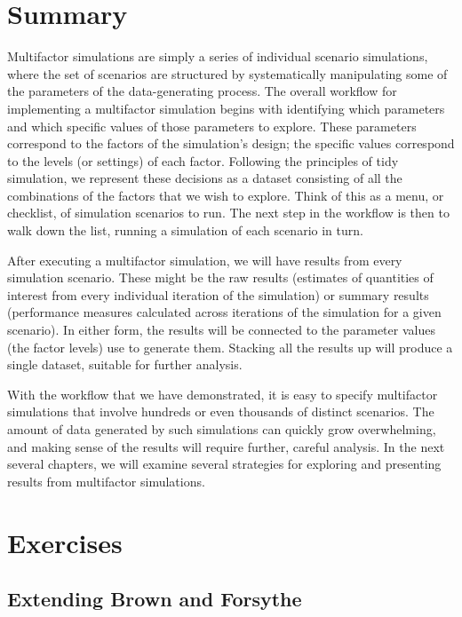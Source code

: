 \documentclass[
]{book}
\begin{document}
\section{Summary}\label{summary}

Multifactor simulations are simply a series of individual scenario simulations, where the set of scenarios are structured by systematically manipulating some of the parameters of the data-generating process.
The overall workflow for implementing a multifactor simulation begins with identifying which parameters and which specific values of those parameters to explore.
These parameters correspond to the factors of the simulation's design; the specific values correspond to the levels (or settings) of each factor.
Following the principles of tidy simulation, we represent these decisions as a dataset consisting of all the combinations of the factors that we wish to explore.
Think of this as a menu, or checklist, of simulation scenarios to run.
The next step in the workflow is then to walk down the list, running a simulation of each scenario in turn.

After executing a multifactor simulation, we will have results from every simulation scenario.
These might be the raw results (estimates of quantities of interest from every individual iteration of the simulation) or summary results (performance measures calculated across iterations of the simulation for a given scenario).
In either form, the results will be connected to the parameter values (the factor levels) use to generate them.
Stacking all the results up will produce a single dataset, suitable for further analysis.

With the workflow that we have demonstrated, it is easy to specify multifactor simulations that involve hundreds or even thousands of distinct scenarios.
The amount of data generated by such simulations can quickly grow overwhelming, and making sense of the results will require further, careful analysis.
In the next several chapters, we will examine several strategies for exploring and presenting results from multifactor simulations.

\section{Exercises}\label{exercises-7}

\subsection{Extending Brown and Forsythe}\label{extending-Brown-Forsythe-power}
\end{document}
